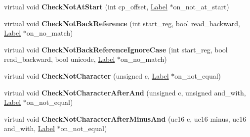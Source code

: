 \begin{DoxyCompactItemize}
\item 
virtual void {\bfseries Check\+Not\+At\+Start} (int cp\+\_\+offset, \hyperlink{classv8_1_1internal_1_1_label}{Label} $\ast$on\+\_\+not\+\_\+at\+\_\+start)\hypertarget{classv8_1_1internal_1_1_reg_exp_macro_assembler_tracer_afc76809aab8de218d35e8903eb422926}{}\label{classv8_1_1internal_1_1_reg_exp_macro_assembler_tracer_afc76809aab8de218d35e8903eb422926}

\item 
virtual void {\bfseries Check\+Not\+Back\+Reference} (int start\+\_\+reg, bool read\+\_\+backward, \hyperlink{classv8_1_1internal_1_1_label}{Label} $\ast$on\+\_\+no\+\_\+match)\hypertarget{classv8_1_1internal_1_1_reg_exp_macro_assembler_tracer_a3e5347d6bfd9faf81825cc9b6f8c2c68}{}\label{classv8_1_1internal_1_1_reg_exp_macro_assembler_tracer_a3e5347d6bfd9faf81825cc9b6f8c2c68}

\item 
virtual void {\bfseries Check\+Not\+Back\+Reference\+Ignore\+Case} (int start\+\_\+reg, bool read\+\_\+backward, bool unicode, \hyperlink{classv8_1_1internal_1_1_label}{Label} $\ast$on\+\_\+no\+\_\+match)\hypertarget{classv8_1_1internal_1_1_reg_exp_macro_assembler_tracer_a1bda2f0aadecef615d8ced1abbf19b92}{}\label{classv8_1_1internal_1_1_reg_exp_macro_assembler_tracer_a1bda2f0aadecef615d8ced1abbf19b92}

\item 
virtual void {\bfseries Check\+Not\+Character} (unsigned c, \hyperlink{classv8_1_1internal_1_1_label}{Label} $\ast$on\+\_\+not\+\_\+equal)\hypertarget{classv8_1_1internal_1_1_reg_exp_macro_assembler_tracer_ab96b6a1a33f5a61f2ab269a35a70a508}{}\label{classv8_1_1internal_1_1_reg_exp_macro_assembler_tracer_ab96b6a1a33f5a61f2ab269a35a70a508}

\item 
virtual void {\bfseries Check\+Not\+Character\+After\+And} (unsigned c, unsigned and\+\_\+with, \hyperlink{classv8_1_1internal_1_1_label}{Label} $\ast$on\+\_\+not\+\_\+equal)\hypertarget{classv8_1_1internal_1_1_reg_exp_macro_assembler_tracer_a88da33563b8ab38073a6564342db334d}{}\label{classv8_1_1internal_1_1_reg_exp_macro_assembler_tracer_a88da33563b8ab38073a6564342db334d}

\item 
virtual void {\bfseries Check\+Not\+Character\+After\+Minus\+And} (uc16 c, uc16 minus, uc16 and\+\_\+with, \hyperlink{classv8_1_1internal_1_1_label}{Label} $\ast$on\+\_\+not\+\_\+equal)\hypertarget{classv8_1_1internal_1_1_reg_exp_macro_assembler_tracer_a45f1fba20ff14da621290756aff98f6c}{}\label{classv8_1_1internal_1_1_reg_exp_macro_assembler_tracer_a45f1fba20ff14da621290756aff98f6c}


\end{DoxyCompactItemize}
